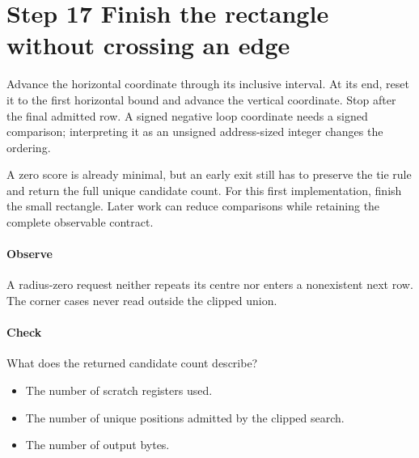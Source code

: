 \section{Step 17 Finish the rectangle without crossing an edge}\label{h263-motion-s07}
Advance the horizontal coordinate through its inclusive interval. At its end,
reset it to the first horizontal bound and advance the vertical coordinate.
Stop after the final admitted row. A signed negative loop coordinate needs a
signed comparison; interpreting it as an unsigned address-sized integer changes
the ordering.

A zero score is already minimal, but an early exit still has to preserve the
tie rule and return the full unique candidate count. For this first implementation,
finish the small rectangle. Later work can reduce comparisons while retaining
the complete observable contract.

\paragraph{Observe} A radius-zero request neither repeats its centre nor enters
a nonexistent next row. The corner cases never read outside the clipped union.
\paragraph{Check} What does the returned candidate count describe?
\begin{itemize}
  \item[A.] The number of scratch registers used.
  \item[B.] The number of unique positions admitted by the clipped search.
  \item[C.] The number of output bytes.
\end{itemize}
